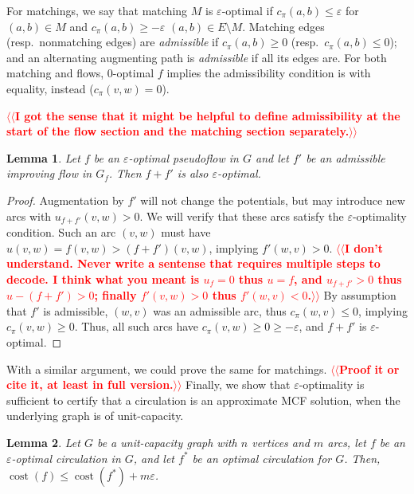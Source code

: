 \documentclass[11pt]{article}
\makeatletter
\def\eps{\varepsilon}
\theoremstyle{plain}
\newtheorem{lemma}{Lemma}
\def\cost{\operatorname{cost}}
\def\n@te#1{\textsf{\boldmath \textbf{$\langle\!\langle$#1$\rangle\!\rangle$}}\leavevmode}
\def\note#1{\textcolor{red}{\n@te{#1}}}
\makeatother
\begin{document}
For matchings, we say that matching $M$ is $\eps$-optimal if $c_\pi(a, b) \leq \eps$ for
$(a, b) \in M$ and $c_\pi(a, b) \geq -\eps$ $(a, b) \in E \setminus M$.
Matching edges (resp.\ nonmatching edges) are \emph{admissible} if $c_\pi(a, b) \geq 0$ (resp.\ $c_\pi(a, b) \leq 0$); and an alternating augmenting path is \emph{admissible}
if all its edges are.
For both matching and flows, 0-optimal $f$ implies the admissibility condition
is with equality, instead ($c_\pi(v, w) = 0$).

\note{I got the sense that it might be helpful to define admissibility at the start of the flow section and the matching section separately.}

\begin{lemma}
	Let $f$ be an $\eps$-optimal pseudoflow in $G$ and let $f'$ be an
	admissible improving flow in $G_f$.
	Then $f + f'$ is also $\eps$-optimal.
\end{lemma}
\begin{proof}
	Augmentation by $f'$ will not change the potentials, but may introduce
	new arcs with $u_{f+f'}(v, w) > 0$.
	We will verify that these arcs satisfy the $\eps$-optimality condition.
	Such an arc $(v, w)$ must have $u(v, w) = f(v, w) > (f+f')(v, w)$,
	implying $f'(w, v) > 0$.
\note{I don't understand.  Never write a sentense that requires multiple steps to decode. I think what you meant is $u_f = 0$ thus $u=f$, and $u_{f+f'} > 0$ thus $u-(f+f') > 0$; finally $f'(v,w) > 0$ thus $f'(w,v) < 0$.}
	By assumption that $f'$ is admissible, $(w, v)$ was an admissible arc, thus
	$c_\pi(w, v) \leq 0$, implying $c_\pi(v, w) \geq 0$.
	Thus, all such arcs have $c_\pi(v, w) \geq 0 \geq -\eps$, and $f + f'$
	is $\eps$-optimal.
\end{proof}

With a similar argument, we could prove the same for matchings. \note{Proof it or cite it, at least in full version.}
Finally, we show that $\eps$-optimality is sufficient to certify that a
circulation is an approximate MCF solution, when the underlying graph is
of unit-capacity.

\begin{lemma}
\label{lemma:mcf_cost}
Let $G$ be a unit-capacity graph with $n$ vertices and $m$ arcs, let $f$ be an
$\eps$-optimal circulation in $G$, and let $f^*$ be an optimal circulation for
$G$.
Then, $\cost(f) \leq \cost(f^*) + m\eps$.
\end{lemma}
\end{document}
